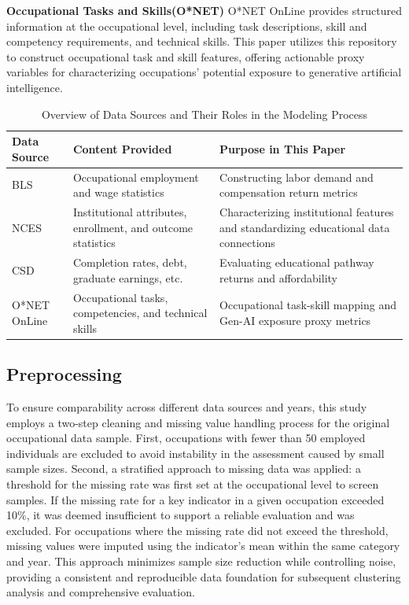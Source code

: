 \documentclass{mcmthesis}
\begin{document}
\noindent\textbf{Occupational Tasks and Skills(O*NET)} O*NET OnLine provides structured information at the occupational level, including task descriptions, skill and competency requirements, and technical skills. This paper utilizes this repository to construct occupational task and skill features, offering actionable proxy variables for characterizing occupations' potential exposure to generative artificial intelligence.

\begin{table}[ht!]
\centering
\caption{Overview of Data Sources and Their Roles in the Modeling Process}
\label{tab:data_sources_cn}
\renewcommand{\arraystretch}{1.15}
\setlength{\tabcolsep}{6pt}
\begin{tabularx}{\linewidth}{@{}l X X@{}}
\toprule
\textbf{Data Source} & \textbf{Content Provided} & \textbf{Purpose in This Paper} \\
\midrule
BLS\cite{BLS} & Occupational employment and wage statistics & Constructing labor demand and compensation return metrics \\
NCES\cite{NCES} & Institutional attributes, enrollment, and outcome statistics & Characterizing institutional features and standardizing educational data connections \\
CSD\cite{CSD} & Completion rates, debt, graduate earnings, etc. & Evaluating educational pathway returns and affordability \\
O*NET OnLine\cite{ONET} & Occupational tasks, competencies, and technical skills & Occupational task-skill mapping and Gen-AI exposure proxy metrics \\
\bottomrule
\end{tabularx}
\end{table}

\subsection{Preprocessing}
To ensure comparability across different data sources and years, this study employs a two-step cleaning and missing value handling process for the original occupational data sample. First, occupations with fewer than 50 employed individuals are excluded to avoid instability in the assessment caused by small sample sizes. Second, a stratified approach to missing data was applied: a threshold for the missing rate was first set at the occupational level to screen samples. If the missing rate for a key indicator in a given occupation exceeded 10\%, it was deemed insufficient to support a reliable evaluation and was excluded. For occupations where the missing rate did not exceed the threshold, missing values were imputed using the indicator's mean within the same category and year. This approach minimizes sample size reduction while controlling noise, providing a consistent and reproducible data foundation for subsequent clustering analysis and comprehensive evaluation.
\end{document}

